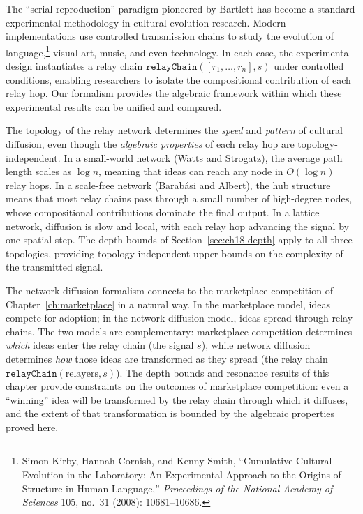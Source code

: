 \begin{remark}
\label{rem:telephone-methodology}
The ``serial reproduction'' paradigm pioneered by Bartlett has become a
standard experimental methodology in cultural evolution research.  Modern
implementations use controlled transmission chains to study the evolution
of language,\footnote{Simon Kirby, Hannah Cornish, and Kenny Smith,
``Cumulative Cultural Evolution in the Laboratory: An Experimental Approach
to the Origins of Structure in Human Language,'' \textit{Proceedings of the
National Academy of Sciences} 105, no.\ 31 (2008): 10681--10686.}
visual art, music, and even technology.  In each case, the experimental
design instantiates a relay chain $\texttt{relayChain}([r_1, \ldots, r_n], s)$
under controlled conditions, enabling researchers to isolate the
compositional contribution of each relay hop.  Our formalism provides the
algebraic framework within which these experimental results can be
unified and compared.
\end{remark}

\begin{remark}
\label{rem:topology-speed}
The topology of the relay network determines the \emph{speed} and
\emph{pattern} of cultural diffusion, even though the \emph{algebraic
properties} of each relay hop are topology-independent.  In a
small-world network (Watts and Strogatz), the average path length
scales as $\log n$, meaning that ideas can reach any node in
$O(\log n)$ relay hops.  In a scale-free network (Barab\'asi and Albert),
the hub structure means that most relay chains pass through a small
number of high-degree nodes, whose compositional contributions dominate
the final output.  In a lattice network, diffusion is slow and local,
with each relay hop advancing the signal by one spatial step.  The
depth bounds of Section~\ref{sec:ch18-depth} apply to all three
topologies, providing topology-independent upper bounds on the complexity
of the transmitted signal.
\end{remark}

\begin{remark}
\label{rem:marketplace-connection}
The network diffusion formalism connects to the marketplace competition
of Chapter~\ref{ch:marketplace} in a natural way.  In the marketplace
model, ideas compete for adoption; in the network diffusion model, ideas
spread through relay chains.  The two models are complementary: marketplace
competition determines \emph{which} ideas enter the relay chain (the
signal $s$), while network diffusion determines \emph{how} those ideas
are transformed as they spread (the relay chain $\texttt{relayChain}(
\text{relayers}, s)$).  The depth bounds and resonance results of this
chapter provide constraints on the outcomes of marketplace competition:
even a ``winning'' idea will be transformed by the relay chain through
which it diffuses, and the extent of that transformation is bounded by
the algebraic properties proved here.
\end{remark}

